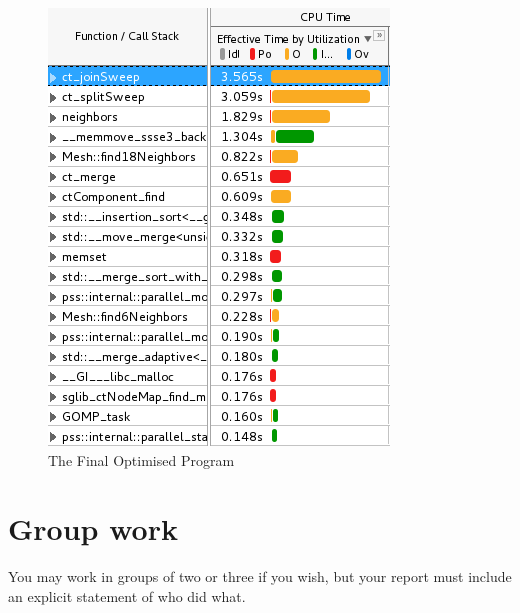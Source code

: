 \documentclass[conference]{IEEEtran}
\begin{document}
\begin{figure}[!h]
	\centering
	\includegraphics[width=\columnwidth]{opt_vtune}
	\caption{The Final Optimised Program}
	\label{fig:opt}
\end{figure}


\section{Group work}

You may work in groups of two or three if you wish, but your report must include an explicit statement of who did what.

%
%
\end{document}
